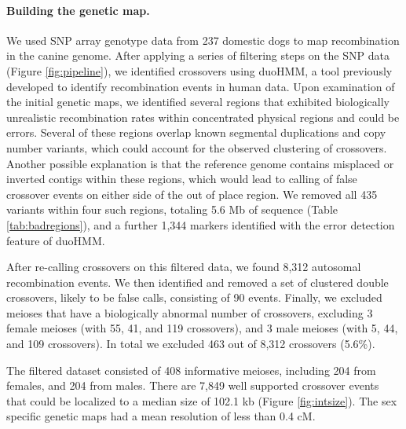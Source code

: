 \paragraph{Building the genetic map.}
We used SNP array genotype data from 237 domestic dogs to map recombination in the canine genome. %
After applying a series of filtering steps on the SNP data (Figure \ref{fig:pipeline}),
we identified crossovers using duoHMM, a tool previously developed to identify recombination events in human data\cite{OConnell2014}.
Upon examination of the initial genetic maps, we identified several regions that exhibited biologically unrealistic recombination rates within concentrated physical regions and could be errors.
Several of these regions overlap known segmental duplications and copy number variants\cite{Nicholas2009,Chen2009}, which could account for the observed clustering of crossovers.
Another possible explanation is that the reference genome contains misplaced or inverted contigs within these regions, which would lead to calling of false crossover events on either side of the out of place region.
We removed all 435 variants within four such regions, totaling 5.6 Mb of sequence (Table \ref{tab:badregions}), and
a further 1,344 markers identified with the error detection feature of duoHMM. %

After re-calling crossovers on this filtered data, we found 8,312 autosomal recombination events.
We then identified and removed a set of clustered double crossovers, likely to be false calls, consisting of 90 events. %
Finally, we excluded meioses that have a biologically abnormal number of crossovers, excluding 3 female meioses (with 55, 41, and 119 crossovers), and 3 male meioses (with 5, 44, and 109 crossovers).
In total we excluded 463 out of 8,312 crossovers (5.6\%).

The filtered dataset consisted of 408 informative meioses, including 204 from females, and 204 from males.
There are 7,849 well supported crossover events that could be localized to a median size of 102.1 kb (Figure \ref{fig:intsize}).
The sex specific genetic maps had a mean resolution of less than 0.4 cM. %

